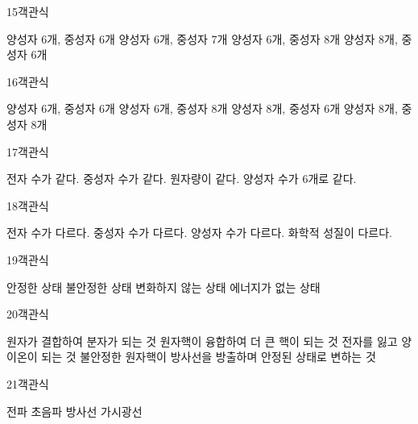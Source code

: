 \documentclass[fs9,seriesRus]{korfarm-base}
\begin{document}
\begin{kfQBlock}{15}{객관식}
\begin{kfChoices}
\kfChoice 양성자 6개, 중성자 6개
\kfChoice 양성자 6개, 중성자 7개
\kfChoice 양성자 6개, 중성자 8개
\kfChoice 양성자 8개, 중성자 6개
\end{kfChoices}
\end{kfQBlock}
\begin{kfQBlock}{16}{객관식}
\begin{kfChoices}
\kfChoice 양성자 6개, 중성자 6개
\kfChoice 양성자 6개, 중성자 8개
\kfChoice 양성자 8개, 중성자 6개
\kfChoice 양성자 8개, 중성자 8개
\end{kfChoices}
\end{kfQBlock}
\begin{kfQBlock}{17}{객관식}
\begin{kfChoices}
\kfChoice 전자 수가 같다.
\kfChoice 중성자 수가 같다.
\kfChoice 원자량이 같다.
\kfChoice 양성자 수가 6개로 같다.
\end{kfChoices}
\end{kfQBlock}
\begin{kfQBlock}{18}{객관식}
\begin{kfChoices}
\kfChoice 전자 수가 다르다.
\kfChoice 중성자 수가 다르다.
\kfChoice 양성자 수가 다르다.
\kfChoice 화학적 성질이 다르다.
\end{kfChoices}
\end{kfQBlock}
\begin{kfQBlock}{19}{객관식}
\begin{kfChoices}
\kfChoice 안정한 상태
\kfChoice 불안정한 상태
\kfChoice 변화하지 않는 상태
\kfChoice 에너지가 없는 상태
\end{kfChoices}
\end{kfQBlock}
\begin{kfQBlock}{20}{객관식}
\begin{kfChoices}
\kfChoice 원자가 결합하여 분자가 되는 것
\kfChoice 원자핵이 융합하여 더 큰 핵이 되는 것
\kfChoice 전자를 잃고 양이온이 되는 것
\kfChoice 불안정한 원자핵이 방사선을 방출하며 안정된 상태로 변하는 것
\end{kfChoices}
\end{kfQBlock}
\begin{kfQBlock}{21}{객관식}
\begin{kfChoices}
\kfChoice 전파
\kfChoice 초음파
\kfChoice 방사선
\kfChoice 가시광선
\end{kfChoices}
\end{kfQBlock}
\end{document}

